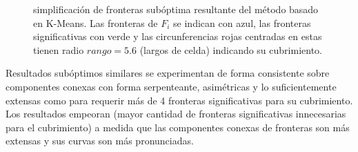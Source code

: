 \begin{figure}[H]
  \centering
  \qquad

  \caption[simplificación de fronteras subóptima resultante del método basado en K-Means.]{simplificación de fronteras subóptima resultante del método basado en K-Means. Las fronteras de $F_i$ se indican con azul, las fronteras significativas con verde y las
    circunferencias rojas centradas en estas tienen radio $rango=5.6$ (largos de celda) indicando su
    cubrimiento.}\label{fig:ejemploFSKMMal}
\end{figure}
Resultados subóptimos similares se experimentan de forma consistente sobre
componentes conexas con forma serpenteante, asimétricas y lo suficientemente
extensas como para requerir más de 4 fronteras significativas para su
cubrimiento. 
Los resultados empeoran (mayor cantidad de fronteras significativas
innecesarias para el cubrimiento) a medida que las componentes conexas de
fronteras son más extensas y sus curvas son más pronunciadas.

